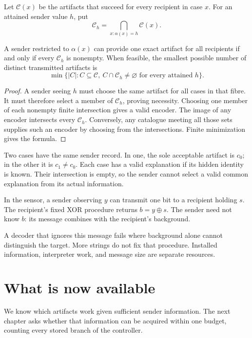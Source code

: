 Let $\mathcal C(x)$ be the artifacts that succeed for every recipient in case $x$. For an attained sender value $h$, put
\[
\mathcal C_h=\bigcap_{x:\alpha(x)=h}\mathcal C(x).
\]

\begin{theorem}\label{r:recipient}
A sender restricted to $\alpha(x)$ can provide one exact artifact for all recipients if and only if every $\mathcal C_h$ is nonempty. When feasible, the smallest possible number of distinct transmitted artifacts is
\[
\min\{|C|:C\subseteq\mathcal C,\ C\cap\mathcal C_h\ne\varnothing
\text{ for every attained }h\}.
\]
\end{theorem}
\begin{proof}
A sender seeing $h$ must choose the same artifact for all cases in that fibre. It must therefore select a member of $\mathcal C_h$, proving necessity. Choosing one member of each nonempty finite intersection gives a valid encoder. The image of any encoder intersects every $\mathcal C_h$. Conversely, any catalogue meeting all those sets supplies such an encoder by choosing from the intersections. Finite minimization gives the formula.
\end{proof}

\begin{counterexample}\label{ce:message}
Two cases have the same sender record. In one, the sole acceptable artifact is $c_0$; in the other it is $c_1\ne c_0$. Each case has a valid explanation if its hidden identity is known. Their intersection is empty, so the sender cannot select a valid common explanation from its actual information.
\end{counterexample}

In the sensor, a sender observing $y$ can transmit one bit to a recipient holding $s$. The recipient's fixed XOR procedure returns $b=y\oplus s$. The sender need not know $b$: its message combines with the recipient's background.

A decoder that ignores this message fails where background alone cannot distinguish the target. More strings do not fix that procedure. Installed information, interpreter work, and message size are separate resources.

\section*{What is now available}
We know which artifacts work given sufficient sender information. The next chapter asks whether that information can be acquired within one budget, counting every stored branch of the controller.


